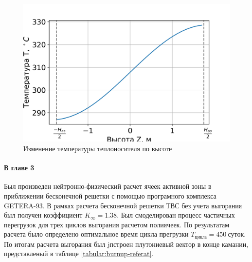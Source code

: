 \begin{figure}[H]
	\begin{center}
		\includegraphics[]{Tz.png}
		\caption{Изменение температуры теплоносителя по высоте}
		\label{pic:TZ-referat} %
	\end{center}
\end{figure}

\paragraph{В главе 3} Был произведен нейтронно-физический расчет ячеек активной зоны в приближении бесконечной решетки с помощью програмного комплекса GETERA-93. В рамках расчета бесконечной решетки ТВС без учета выгорания был получен коэффициент $K_{\infty} = 1.38$. Был смоделирован процесс частичных перегрузок для трех циклов выгорания расчетом полиячеек. По результатам расчета было определено оптимальное время цикла прегрузки $T_{\text{цикла}} = 450\ \text{суток}$. По итогам расчета выгорания был jпстроен плутониевый вектор в конце камании, представленый в таблице \ref{tabular:burnup-referat}.

